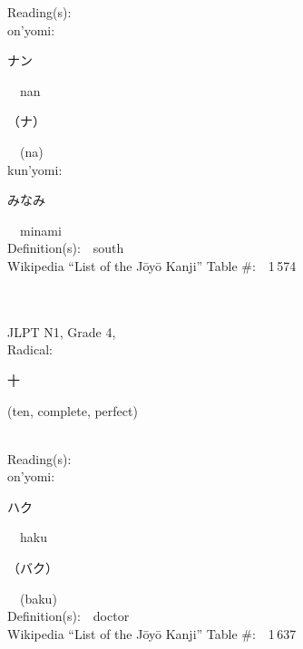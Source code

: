 \begin{multicols}{2}
Reading(s):\ \ \\
{\hspace*{1em}}on'yomi:\ \ \\
{\hspace*{2em}}{\begin{CJK}{UTF8}{min} ナン \end{CJK}}\ \ nan\ \ \\
{\hspace*{2em}}{\begin{CJK}{UTF8}{min} （ナ） \end{CJK}}\ \ (na)\ \ \\
{\hspace*{1em}}kun'yomi:\ \ \\
{\hspace*{2em}}{\begin{CJK}{UTF8}{min} みなみ \end{CJK}}\ \ minami\ \ \\
Definition(s):\ \ south \\
Wikipedia ``List of the J\=oy\=o Kanji'' Table \#:\ \ 1\,574 \\
\ \ \\
{\fontsize{34pt}{40pt}  }\ \ \\  %
{JLPT N1, Grade 4, \\Radical:\ \ {\begin{CJK}{UTF8}{min} 十 \end{CJK}} (ten, complete, perfect) } \\
Reading(s):\ \ \\
{\hspace*{1em}}on'yomi:\ \ \\
{\hspace*{2em}}{\begin{CJK}{UTF8}{min} ハク \end{CJK}}\ \ haku\ \ \\
{\hspace*{2em}}{\begin{CJK}{UTF8}{min} （バク） \end{CJK}}\ \ (baku)\ \ \\
Definition(s):\ \ doctor \\
Wikipedia ``List of the J\=oy\=o Kanji'' Table \#:\ \ 1\,637 \\
\ \ \\
{\fontsize{34pt}{40pt}  }\ \ \\  %

\end{multicols}
